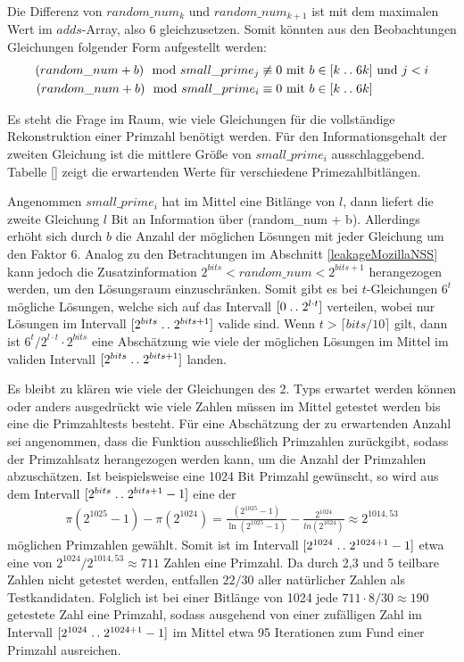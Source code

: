 Die Differenz von $random\_num_k$ und $random\_num_{k+1}$ ist mit dem maximalen Wert im $adds$-Array, also 6 gleichzusetzen.
Somit könnten aus den Beobachtungen Gleichungen folgender Form aufgestellt werden:
\begin{align*}
    (random\_num + b) \mod small\_prime_j \not\equiv 0 &\text{ mit } b \in [k\mathrel{{.}\,{.}}\nobreak6k] \text{ und } j < i\\
    (random\_num + b) \mod small\_prime_i \equiv 0 &\text{ mit } b \in [k\mathrel{{.}\,{.}}\nobreak6k]
\end{align*}

Es steht die Frage im Raum, wie viele Gleichungen für die vollständige Rekonstruktion einer Primzahl benötigt werden.
Für den Informationsgehalt der zweiten Gleichung ist die mittlere Größe von $small\_prime_i$ ausschlaggebend.
Tabelle \ref{} zeigt die erwartenden Werte für verschiedene Primezahlbitlängen. 

Angenommen $small\_prime_i$ hat im Mittel eine Bitlänge von $l$, dann liefert die zweite Gleichung $l$ Bit an Information über (random\_num + b).
Allerdings erhöht sich durch $b$ die Anzahl der möglichen Lösungen mit jeder Gleichung um den Faktor 6.
Analog zu den Betrachtungen im Abschnitt \ref{leakageMozillaNSS} kann jedoch die Zusatzinformation $2^{bits} < random\_num < 2^{bits+1}$ herangezogen werden, um den Lösungsraum einzuschränken.
Somit gibt es bei $t$-Gleichungen $6^t$ mögliche Lösungen, welche sich auf das Intervall $[0 \mathrel{{.}\,{.}}\nobreak2^{l\cdot t}]$ verteilen, wobei nur Lösungen im Intervall $[2^{bits} \mathrel{{.}\,{.}}\nobreak 2^{bits+1}]$ valide sind.
Wenn $t > \lceil bits/10 \rceil$ gilt, dann ist $6^t/2^{l \cdot t} \cdot 2^{bits}$ eine Abschätzung wie viele der möglichen Lösungen im Mittel im validen Intervall $[2^{bits} \mathrel{{.}\,{.}}\nobreak 2^{bits+1}]$ landen.

Es bleibt zu klären wie viele der Gleichungen des 2. Typs erwartet werden können oder anders ausgedrückt wie viele Zahlen müssen im Mittel getestet werden bis eine die Primzahltests besteht. 
Für eine Abschätzung der zu erwartenden Anzahl sei angenommen, dass die Funktion ausschließlich Primzahlen zurückgibt, sodass der Primzahlsatz herangezogen werden kann, um die Anzahl der Primzahlen abzuschätzen.
Ist beispielsweise eine 1024 Bit Primzahl gewünscht, so wird aus dem Intervall $[2^{bits}\mathrel{{.}\,{.}}\nobreak 2^{bits+1}-1]$ eine der \begin{align}
\pi(2^{1025}-1) - \pi(2^{1024}) = \frac{(2^{1025}-1)}{\ln(2^{1025}-1)} - \frac{2^{1024}}{ln(2^{1024})} \approx 2^{1014,53}
\end{align}
möglichen Primzahlen gewählt.
Somit ist im Intervall $[2^{1024}\mathrel{{.}\,{.}}\nobreak 2^{1024+1}-1]$ etwa eine von $2^{1024}/2^{1014,53} \approx 711$ Zahlen eine Primzahl.
Da durch 2,3 und 5 teilbare Zahlen nicht getestet werden, entfallen $22/30$ aller natürlicher Zahlen als Testkandidaten.
Folglich ist bei einer Bitlänge von 1024 jede $711 \cdot 8/30 \approx 190$ getestete Zahl eine Primzahl, sodass ausgehend von einer zufälligen Zahl im Intervall $[2^{1024}\mathrel{{.}\,{.}}\nobreak 2^{1024+1}-1]$ im Mittel etwa 95 Iterationen zum Fund einer Primzahl ausreichen.

